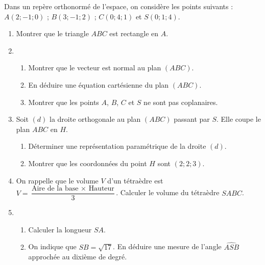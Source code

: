 \documentclass[11pt,fleqn, openany]{book} %
\begin{document}
\begin{exercise}[topic=geom16, subtitle={(Centres étrangers 2021)}]

Dans un repère orthonormé de l'espace, on considère les points suivants : $A(2 ; -1 ; 0)$ ; $B(3 ; -1 ; 2)$ ; $C(0 ; 4 ; 1)$ et $S(0 ; 1 ; 4)$.

\begin{enumerate}
\item Montrer que le triangle $ABC$ est rectangle en $A$.
\item 
\begin{enumerate}
\item  Montrer que le vecteur   est normal au plan $(ABC)$.
\item En déduire une équation cartésienne du plan $(ABC)$.
\item Montrer que les points $A$, $B$, $C$ et $S$ ne sont pas coplanaires.
\end{enumerate}
\vskip5pt
\item Soit $(d)$ la droite orthogonale au plan $(ABC)$ passant par $S$. Elle coupe le plan $ABC$ en $H$.
\begin{enumerate}
\item Déterminer une représentation paramétrique de la droite $(d)$.
\item  Montrer que les coordonnées du point $H$ sont $(2;2;3)$.
\end{enumerate}
\vskip5pt
\item On rappelle que le volume $V$ d'un tétraèdre est $ V = \dfrac{\text{Aire de la base } \times \text{ Hauteur}}{3}$. Calculer le volume du tétraèdre $SABC$.
\vskip5pt
\item \begin{enumerate}
\item Calculer la longueur $SA$.
\item On indique que $SB=\sqrt{17}$. En déduire une mesure de l'angle $\widehat{ASB}$ approchée au dixième de degré.
\end{enumerate}\end{enumerate}
\end{exercise}
\end{document}
